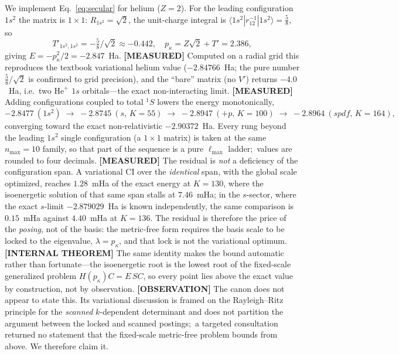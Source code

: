 \documentclass[aps,pra,twocolumn,superscriptaddress,longbibliography]{revtex4-2}
\newcommand{\gvq}[2]{#2}
\begin{document}
We implement Eq.~\eqref{eq:secular} for helium ($Z=2$).  For the leading
configuration $1s^2$ the matrix is $1\times1$: $R_{1s^2}=\sqrt2$, the
unit-charge integral is $\langle 1s^2|r_{12}^{-1}|1s^2\rangle=\tfrac58$, so
\begin{equation}
T'_{1s^2,1s^2}=-\tfrac{5}{8}/\sqrt2\approx-0.442,\quad
p_\kappa=Z\sqrt2+T'=2.386,
\end{equation}
giving $E=-p_\kappa^2/2=-2.847$~Ha.  \textbf{[MEASURED]} Computed on a radial
grid this reproduces the textbook variational helium value
($-2.84766$~Ha; the pure number $\tfrac58/\sqrt2$ is confirmed to grid
precision), and the ``bare'' matrix (no $V'$) returns $-4.0$~Ha, i.e.\ two
$\mathrm{He}^+$ $1s$ orbitals---the exact non-interacting limit.  \textbf{[MEASURED]}
Adding configurations coupled to total $^1S$ lowers the energy monotonically,
\[
-2.8477\ (1s^2)\;\to\;\gvq{p60_he_chain_s_k55}{-2.8745}\ (s,\,K{=}55)\;\to\;-2.8947\ (+p,\,K{=}100)\;\to\;\gvq{p60_he_chain_spdf_k164}{-2.8964}\ (spdf,\,K{=}164),
\]
converging toward the exact non-relativistic $-2.90372$~Ha.  Every rung beyond the leading $1s^2$ single configuration (a $1\times1$ matrix) is taken at the same $n_{\max}=10$ family, so that part of the sequence is a pure $\ell_{\max}$ ladder;\ values are rounded to four decimals.  \textbf{[MEASURED]}
The residual is \emph{not} a deficiency of the configuration span.  A
variational CI over the \emph{identical} span, with the global scale optimized,
reaches $\gvq{p60_span_deficit_spdf}{1.28}$~mHa of the exact energy at $K=130$,
where the isoenergetic solution of that same span stalls at $7.46$~mHa;  in the
$s$-sector, where the exact $s$-limit $-2.879029$~Ha is known independently, the
same comparison is $\gvq{p60_span_deficit_sonly_free}{0.15}$~mHa against $\gvq{p60_span_deficit_sonly_locked}{4.40}$~mHa at $K=136$.  The residual is
therefore the price of the \emph{posing}, not of the basis:  the metric-free form
requires the basis scale to be locked to the eigenvalue, $\lambda=p_\kappa$, and
that lock is not the variational optimum.  \textbf{[INTERNAL THEOREM]} The same
identity makes the bound automatic rather than fortunate---the isoenergetic root
is the lowest root of the fixed-scale generalized problem $H(p_\kappa)C=E\,SC$,
so every point lies above the exact value by construction, not by observation.
\textbf{[OBSERVATION]} The canon does not appear to state this.  Its variational
discussion is framed on the Rayleigh--Ritz principle for the \emph{scanned}
$k$-dependent determinant and does not partition the argument between the locked
and scanned postings;\ a targeted consultation returned no statement that the
fixed-scale metric-free problem bounds from above.  We therefore claim it.
\end{document}
